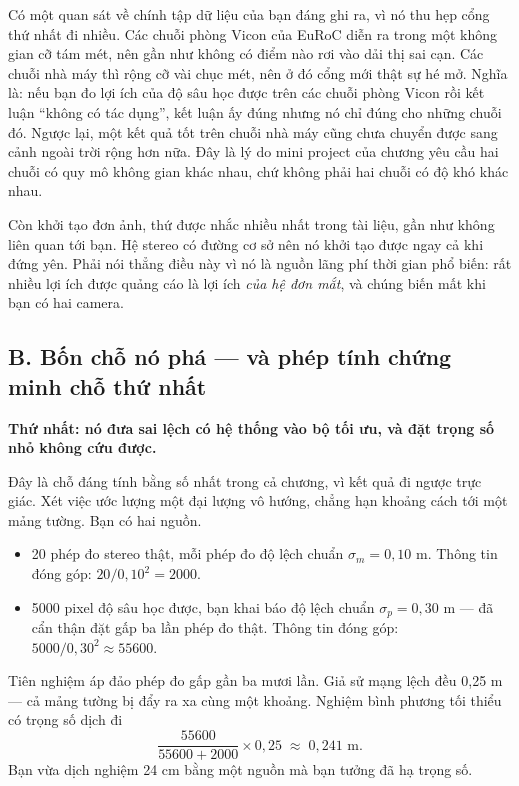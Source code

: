 \documentclass[../../deep_learning.tex]{subfiles}
\begin{document}
Có một quan sát về chính tập dữ liệu của bạn đáng ghi ra, vì nó thu hẹp cổng thứ nhất đi nhiều. Các chuỗi phòng Vicon của EuRoC diễn ra trong một không gian cỡ tám mét, nên gần như không có điểm nào rơi vào dải thị sai cạn. Các chuỗi nhà máy thì rộng cỡ vài chục mét, nên ở đó cổng mới thật sự hé mở. Nghĩa là: nếu bạn đo lợi ích của độ sâu học được trên các chuỗi phòng Vicon rồi kết luận ``không có tác dụng'', kết luận ấy đúng nhưng nó chỉ đúng cho những chuỗi đó. Ngược lại, một kết quả tốt trên chuỗi nhà máy cũng chưa chuyển được sang cảnh ngoài trời rộng hơn nữa. Đây là lý do mini project của chương yêu cầu hai chuỗi có quy mô không gian khác nhau, chứ không phải hai chuỗi có độ khó khác nhau.

Còn khởi tạo đơn ảnh, thứ được nhắc nhiều nhất trong tài liệu, gần như không liên quan tới bạn. Hệ stereo có đường cơ sở nên nó khởi tạo được ngay cả khi đứng yên. Phải nói thẳng điều này vì nó là nguồn lãng phí thời gian phổ biến: rất nhiều lợi ích được quảng cáo là lợi ích \emph{của hệ đơn mắt}, và chúng biến mất khi bạn có hai camera.

\subsection{B. Bốn chỗ nó phá --- và phép tính chứng minh chỗ thứ nhất}
\textbf{Thứ nhất: nó đưa sai lệch có hệ thống vào bộ tối ưu, và đặt trọng số nhỏ không cứu được.}

Đây là chỗ đáng tính bằng số nhất trong cả chương, vì kết quả đi ngược trực giác. Xét việc ước lượng một đại lượng vô hướng, chẳng hạn khoảng cách tới một mảng tường. Bạn có hai nguồn.

\begin{itemize}
\item 20 phép đo stereo thật, mỗi phép đo độ lệch chuẩn \(\sigma_m = 0{,}10\) m. Thông tin đóng góp: \(20/0{,}10^2 = 2000\).
\item 5000 pixel độ sâu học được, bạn khai báo độ lệch chuẩn \(\sigma_p = 0{,}30\) m --- đã cẩn thận đặt gấp ba lần phép đo thật. Thông tin đóng góp: \(5000/0{,}30^2 \approx 55600\).
\end{itemize}

Tiên nghiệm áp đảo phép đo gấp gần ba mươi lần. Giả sử mạng lệch đều 0,25 m --- cả mảng tường bị đẩy ra xa cùng một khoảng. Nghiệm bình phương tối thiểu có trọng số dịch đi
\[
\frac{55600}{55600+2000}\times 0{,}25 \;\approx\; 0{,}241 \text{ m}.
\]
Bạn vừa dịch nghiệm 24 cm bằng một nguồn mà bạn tưởng đã hạ trọng số.
\end{document}

